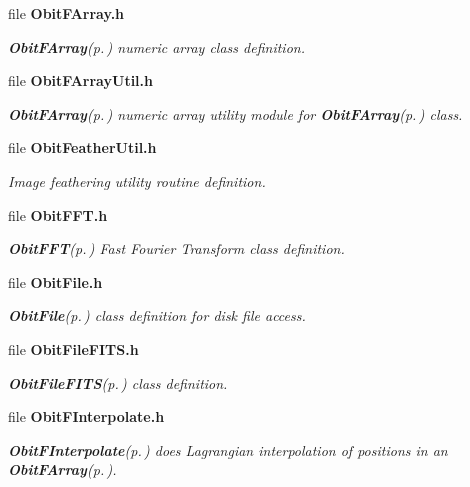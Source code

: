 \begin{CompactItemize}
\item 
file {\bf Obit\-FArray.h}
\begin{CompactList}\small\item\em {\bf Obit\-FArray}{\rm (p.\,\pageref{structObitFArray})} numeric array class definition. \item\end{CompactList}

\item 
file {\bf Obit\-FArray\-Util.h}
\begin{CompactList}\small\item\em {\bf Obit\-FArray}{\rm (p.\,\pageref{structObitFArray})} numeric array utility module for {\bf Obit\-FArray}{\rm (p.\,\pageref{structObitFArray})} class. \item\end{CompactList}

\item 
file {\bf Obit\-Feather\-Util.h}
\begin{CompactList}\small\item\em Image feathering utility routine definition. \item\end{CompactList}

\item 
file {\bf Obit\-FFT.h}
\begin{CompactList}\small\item\em {\bf Obit\-FFT}{\rm (p.\,\pageref{structObitFFT})} Fast Fourier Transform class definition. \item\end{CompactList}

\item 
file {\bf Obit\-File.h}
\begin{CompactList}\small\item\em {\bf Obit\-File}{\rm (p.\,\pageref{structObitFile})} class definition for disk file access. \item\end{CompactList}

\item 
file {\bf Obit\-File\-FITS.h}
\begin{CompactList}\small\item\em {\bf Obit\-File\-FITS}{\rm (p.\,\pageref{structObitFileFITS})} class definition. \item\end{CompactList}

\item 
file {\bf Obit\-FInterpolate.h}
\begin{CompactList}\small\item\em {\bf Obit\-FInterpolate}{\rm (p.\,\pageref{structObitFInterpolate})} does Lagrangian interpolation of positions in an {\bf Obit\-FArray}{\rm (p.\,\pageref{structObitFArray})}. \item\end{CompactList}


\end{CompactItemize}
